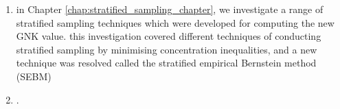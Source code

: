 \begin{enumerate}
{The }\DIFaddend GNK value is \DIFdelbegin {}\DIFdelend \DIFaddbegin {}\DIFaddend .
\item in Chapter \ref{chap:stratified_sampling_chapter}, we investigate a range of stratified sampling techniques which were developed for computing the new GNK value. this investigation covered different techniques of conducting stratified sampling by minimising concentration inequalities, and a new technique was resolved called the stratified empirical Bernstein method (SEBM)\DIFaddbegin {}\item {}\DIFaddend .
\end{enumerate}




